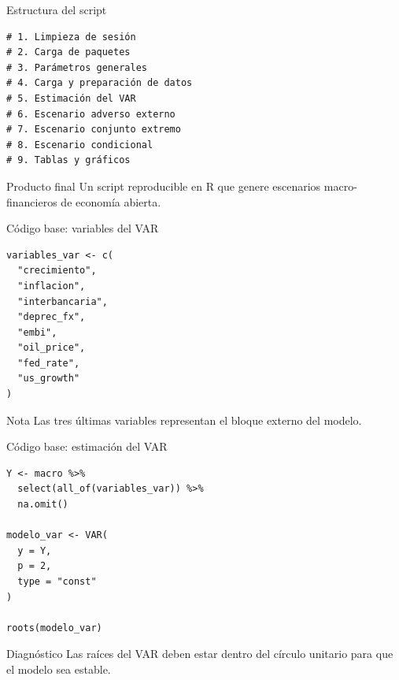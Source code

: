 \documentclass[10pt,aspectratio=169]{beamer}
\begin{document}
\begin{frame}[fragile]{Estructura del script}

\small

\begin{verbatim}
# 1. Limpieza de sesión
# 2. Carga de paquetes
# 3. Parámetros generales
# 4. Carga y preparación de datos
# 5. Estimación del VAR
# 6. Escenario adverso externo
# 7. Escenario conjunto extremo
# 8. Escenario condicional
# 9. Tablas y gráficos
\end{verbatim}

\begin{block}{Producto final}
Un script reproducible en R que genere escenarios macro-financieros de economía abierta.
\end{block}

\end{frame}

\begin{frame}[fragile]{Código base: variables del VAR}

\small

\begin{verbatim}
variables_var <- c(
  "crecimiento",
  "inflacion",
  "interbancaria",
  "deprec_fx",
  "embi",
  "oil_price",
  "fed_rate",
  "us_growth"
)
\end{verbatim}

\begin{alertblock}{Nota}
Las tres últimas variables representan el bloque externo del modelo.
\end{alertblock}

\end{frame}

\begin{frame}[fragile]{Código base: estimación del VAR}

\small

\begin{verbatim}
Y <- macro %>%
  select(all_of(variables_var)) %>%
  na.omit()

modelo_var <- VAR(
  y = Y,
  p = 2,
  type = "const"
)

roots(modelo_var)
\end{verbatim}

\begin{block}{Diagnóstico}
Las raíces del VAR deben estar dentro del círculo unitario para que el modelo sea estable.
\end{block}

\end{frame}
\end{document}
